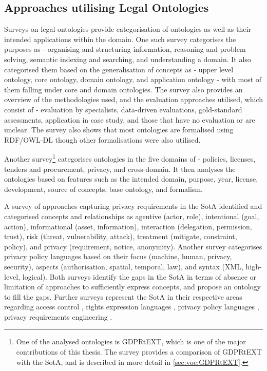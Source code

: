 \subsection{Approaches utilising Legal Ontologies}
Surveys on legal ontologies provide categorisation of ontologies as well as their intended applications within the domain. One such survey \cite{rodrigues_legal_2019} categorises the purposes as - organising and structuring information, reasoning and problem solving, semantic indexing and searching, and understanding a domain. It also categorised them based on the generalisation of concepts as - upper level ontology, core ontology, domain ontology, and application ontology - with most of them falling under core and domain ontologies. The survey also provides an overview of the methodologies used, and the evaluation approaches utilised, which consist of - evaluation by specialists, data-driven evaluations, gold-standard assessments, application in case study, and those that have no evaluation or are unclear. The survey also shows that most ontologies are formalised using RDF/OWL-DL though other formalisations were also utilised.

Another survey\footnote{One of the analysed ontologies is GDPRtEXT, which is one of the major contributions of this thesis. The survey provides a comparison of GDPRtEXT with the SotA, and is described in more detail in \autoref{sec:voc:GDPRtEXT}.} \cite{leone_taking_2019} categorises ontologies in the five domains of - policies, licenses, tenders and procurement, privacy, and cross-domain. It then analyses the ontologies based on features such as the intended domain, purpose, year, license, development, source of concepts, base ontology, and formalism.

A survey of approaches capturing privacy requirements in the SotA \cite{gharib_towards_2017} identified and categorised concepts and relationships as agentive (actor, role), intentional (goal, action), informational (asset, information), interaction (delegation, permission, trust), risk (threat, vulnerability, attack), treatment (mitigate, constraint, policy), and privacy (requirement, notice, anonymity).
Another survey \cite{van_de_ven_qualitative_2016} categorises privacy policy languages based on their focus (machine, human, privacy, security), aspects (authorisation, spatial, temporal, law), and syntax (XML, high-level, logical).
Both surveys identify the gaps in the SotA in terms of absence or limitation of approaches to sufficiently express concepts, and propose an ontology to fill the gaps.
Further surveys represent the SotA in their respective areas regarding access control \cite{kirrane_access_2016}, rights expression languages \cite{pellegrini_genealogy_2018}, privacy policy languages \cite{van_de_ven_qualitative_2016}, privacy requirements engineering \cite{gharib_ontologies_2016}.

